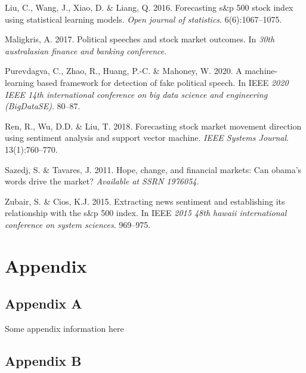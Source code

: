 \documentclass[11pt,preprint, authoryear]{elsarticle}
\numberwithin{equation}{section}
\numberwithin{figure}{section}
\numberwithin{table}{section}
\newlength{\cslhangindent}
\newenvironment{CSLReferences}%
  {\setlength{\parindent}{0pt}%
  \everypar{\setlength{\hangindent}{\cslhangindent}}\ignorespaces}%
  {\par}
\begin{document}
\begin{CSLReferences}{1}{0}
\leavevmode{}%
Liu, C., Wang, J., Xiao, D. \& Liang, Q. 2016. Forecasting s\&p 500
stock index using statistical learning models. \emph{Open journal of
statistics}. 6(6):1067--1075.

\leavevmode{}%
Maligkris, A. 2017. Political speeches and stock market outcomes. In
\emph{30th australasian finance and banking conference}.

\leavevmode{}%
Purevdagva, C., Zhao, R., Huang, P.-C. \& Mahoney, W. 2020. A
machine-learning based framework for detection of fake political speech.
In IEEE \emph{2020 IEEE 14th international conference on big data
science and engineering (BigDataSE)}. 80--87.

\leavevmode{}%
Ren, R., Wu, D.D. \& Liu, T. 2018. Forecasting stock market movement
direction using sentiment analysis and support vector machine.
\emph{IEEE Systems Journal}. 13(1):760--770.

\leavevmode{}%
Sazedj, S. \& Tavares, J. 2011. Hope, change, and financial markets: Can
obama's words drive the market? \emph{Available at SSRN 1976054}.

\leavevmode{}%
Zubair, S. \& Cios, K.J. 2015. Extracting news sentiment and
establishing its relationship with the s\&p 500 index. In IEEE
\emph{2015 48th hawaii international conference on system sciences}.
969--975.

\end{CSLReferences}

\hypertarget{appendix}{%
\section*{Appendix}\label{appendix}}

\hypertarget{appendix-a}{%
\subsection*{Appendix A}\label{appendix-a}}

Some appendix information here

\hypertarget{appendix-b}{%
\subsection*{Appendix B}\label{appendix-b}}


\end{document}
